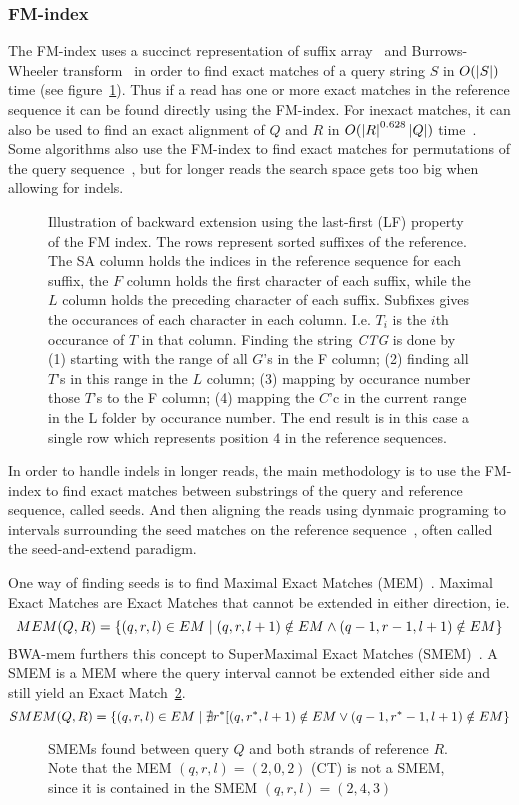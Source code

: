 \subsubsection{FM-index}
The FM-index uses a succinct representation of suffix array~\cite{suffixarray} and Burrows-Wheeler transform~\cite{BWT} in order to find exact matches of a query string $S$ in $O(\left|S\right|)$ time (see figure~\ref{fig:FM}).
Thus if a read has one or more exact matches in the reference sequence it can be found directly using the FM-index.
For inexact matches, it can also be used to find an exact alignment of $Q$ and $R$ in $O(\left|R\right|^{0.628}\left|Q\right|)$ time~\cite{bwtsw,bwalong}.
Some algorithms also use the FM-index to find exact matches for permutations of the query sequence~\cite{bowtie, bwashort}, but for longer reads the search space gets too big when allowing for indels.
\begin{figure}
  \tikzpicture
  
  \endtikzpicture
  \label{fig:FM}
  \caption{Illustration of backward extension using the last-first (LF) property of the FM index.
    The rows represent sorted suffixes of the reference. The SA column holds the indices in the reference sequence for each suffix, the $F$ column holds the first character of each suffix, while the $L$ column holds the preceding character of each suffix. Subfixes gives the occurances of each character in each column. I.e. $T_i$ is the $i$th occurance of $T$ in that column. Finding the string \emph{CTG} is done by (1) starting with the range of all $G$'s in the F column; (2) finding all $T$'s in this range in the $L$ column; (3) mapping by occurance number those $T$'s to the F column; (4) mapping the $C$'c in the current range in the L folder by occurance number. The end result is in this case a single row which represents position $4$ in the reference sequences. 
}
\end{figure}

In order to handle indels in longer reads, the main methodology is to use the FM-index to find exact matches between substrings of the query and reference sequence, called seeds.
And then aligning the reads using dynmaic programing to intervals surrounding the seed matches on the reference sequence~\cite{bowtie2}, often called the seed-and-extend paradigm.

One way of finding seeds is to find Maximal Exact Matches (MEM)~\cite{longmem, origmem}.
Maximal Exact Matches are Exact Matches that cannot be extended in either direction, ie. 
\[
  MEM(Q, R) = \left\{(q, r, l) \in EM \mid (q, r, l+1) \notin EM \wedge (q-1, r-1, l+1) \notin EM\right\}
\]
BWA-mem furthers this concept to SuperMaximal Exact Matches (SMEM)~\cite{origsmem}.
A SMEM is a MEM where the query interval cannot be extended either side and still yield an Exact Match~\ref{fig:smem}.
\[
  SMEM(Q, R) = \left\{(q, r, l) \in EM \mid \nexists r^*[(q, r^*, l+1) \notin EM \vee (q-1, r^*-1, l+1) \notin EM\right\}
\]
\begin{figure}
  \tikzpicture
  
  \endtikzpicture
  \label{fig:smem}
  \caption{SMEMs found between query $Q$ and both strands of reference $R$. Note that the MEM $(q, r, l)=(2, 0, 2)$ (CT) is not a SMEM, since it is contained in the SMEM $(q, r, l) = (2, 4, 3)$}
\end{figure}


